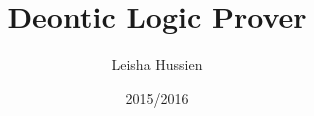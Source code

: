 \documentclass{l4proj}
\begin{document}
\title{Deontic Logic Prover}
\author{Leisha Hussien}
\date{2015/2016}
\maketitle

\begin{abstract}
\end{abstract}
\end{document}
